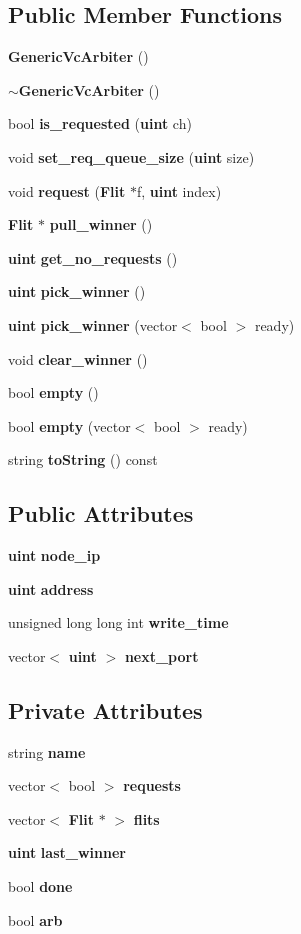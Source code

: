 \subsection*{Public Member Functions}
\begin{CompactItemize}
\item 
{\bf GenericVcArbiter} ()
\item 
{\bf $\sim$GenericVcArbiter} ()
\item 
bool {\bf is\_\-requested} ({\bf uint} ch)
\item 
void {\bf set\_\-req\_\-queue\_\-size} ({\bf uint} size)
\item 
void {\bf request} ({\bf Flit} $\ast$f, {\bf uint} index)
\item 
{\bf Flit} $\ast$ {\bf pull\_\-winner} ()
\item 
{\bf uint} {\bf get\_\-no\_\-requests} ()
\item 
{\bf uint} {\bf pick\_\-winner} ()
\item 
{\bf uint} {\bf pick\_\-winner} (vector$<$ bool $>$ ready)
\item 
void {\bf clear\_\-winner} ()
\item 
bool {\bf empty} ()
\item 
bool {\bf empty} (vector$<$ bool $>$ ready)
\item 
string {\bf toString} () const 
\end{CompactItemize}
\subsection*{Public Attributes}
\begin{CompactItemize}
\item 
{\bf uint} {\bf node\_\-ip}
\item 
{\bf uint} {\bf address}
\item 
unsigned long long int {\bf write\_\-time}
\item 
vector$<$ {\bf uint} $>$ {\bf next\_\-port}
\end{CompactItemize}
\subsection*{Private Attributes}
\begin{CompactItemize}
\item 
string {\bf name}
\item 
vector$<$ bool $>$ {\bf requests}
\item 
vector$<$ {\bf Flit} $\ast$ $>$ {\bf flits}
\item 
{\bf uint} {\bf last\_\-winner}
\item 
bool {\bf done}
\item 
bool {\bf arb}
\end{CompactItemize}


